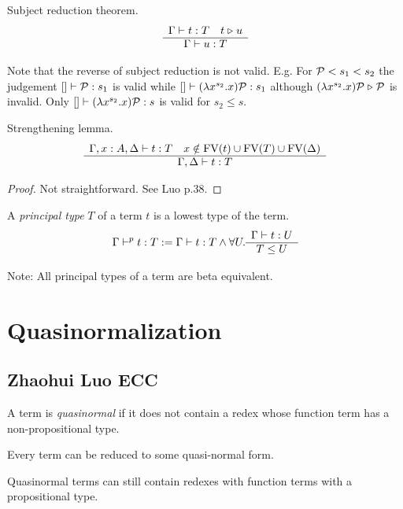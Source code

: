 \begin{theorem}
  Subject reduction theorem.
  $$
  \begin{array}{c} \Gamma \vdash t : T  \quad t \mathrel{\triangleright} u \\ \hline \Gamma \vdash u : T\end{array}
  $$
\end{theorem}

Note that the reverse of subject reduction is not valid. E.g. For
${\cal P} < s_1 < s_2$ the judgement
%
$[] \vdash {\cal P}: s_1$ is valid while
%
$[] \vdash (\lambda x^{s_2}. x) {\cal P} : s_1$
%
although $(\lambda x^{s_2}. x) {\cal P} \mathrel{\triangleright} {\cal P}$ is invalid.
%
Only
%
$[] \vdash (\lambda x^{s_2}. x) {\cal P} : s$
%
is valid for $s_2 \le s$.




\begin{lemma}
  Strengthening lemma.
  $$
  \begin{array}{c} \Gamma,x:A,\Delta \vdash t:T
    \quad
    x \notin \text{FV}(t) \cup \text{FV}(T) \cup \text{FV}(\Delta) \\ \hline \Gamma,\Delta \vdash t : T\end{array}
  $$
  \begin{proof}
    Not straightforward. See Luo p.38.
  \end{proof}
\end{lemma}



\begin{definition}
  A \emph{principal type}
  $T$ of a term $t$ is a lowest type of the term.
  $$
  \Gamma \vdash^p t: T :=
  \Gamma \vdash t :T \land
  \forall U. \begin{array}{c} \Gamma \vdash t: U \\ \hline T \le U\end{array}
  $$
\end{definition}
%
Note: All principal types of a term are beta equivalent.












\section{Quasinormalization}


\subsection{Zhaohui Luo ECC}

A term is \emph{quasinormal} if it does not contain a redex whose function
term has a non-propositional type.

Every term can be reduced to some quasi-normal form.

Quasinormal terms can still contain redexes with function terms with a
propositional type.

